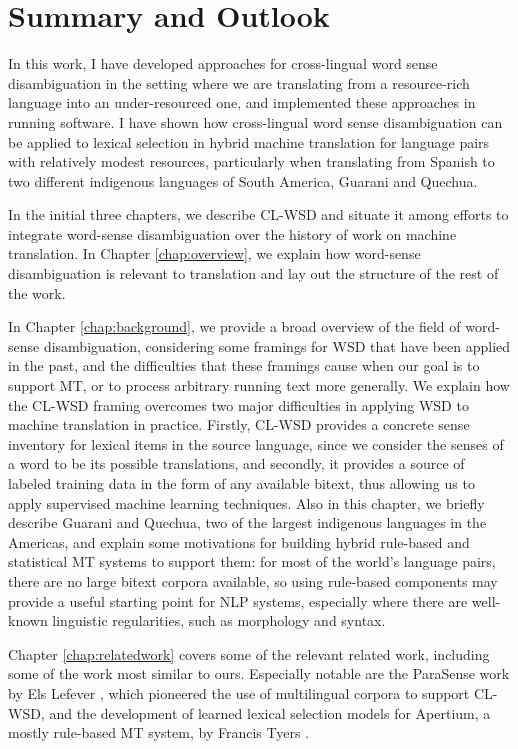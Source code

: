 \chapter{Summary and Outlook}
\label{chap:conclusions}

In this work, I have developed approaches for cross-lingual word sense
disambiguation in the setting where we are translating from a resource-rich
language into an under-resourced one, and implemented these approaches in
running software.
I have shown how cross-lingual word sense disambiguation can be applied to
lexical selection in hybrid machine translation for language pairs with
relatively modest resources, particularly when translating from Spanish to two
different indigenous languages of South America, Guarani and Quechua.

In the initial three chapters, we describe CL-WSD and situate it among efforts
to integrate word-sense disambiguation over the history of work on machine
translation. In Chapter \ref{chap:overview}, we explain how word-sense
disambiguation is relevant to translation and lay out the structure of the rest
of the work.

In Chapter \ref{chap:background}, we provide a broad overview of the field of
word-sense disambiguation, considering some framings for WSD that have been
applied in the past, and the difficulties that these framings cause when our
goal is to support MT, or to process arbitrary running text more generally.
We explain how the CL-WSD framing overcomes two major difficulties in applying
WSD to machine translation in practice. Firstly, CL-WSD provides a concrete
sense inventory for lexical items in the source language, since we consider the
senses of a word to be its possible translations, and secondly, it provides a
source of labeled training data in the form of any available bitext, thus
allowing us to apply supervised machine learning techniques. Also in this
chapter, we briefly describe Guarani and Quechua, two of the largest indigenous
languages in the Americas, and explain some motivations for building hybrid
rule-based and statistical MT systems to support them: for most of the world's
language pairs, there are no large bitext corpora available, so using
rule-based components may provide a useful starting point for NLP systems,
especially where there are well-known linguistic regularities, such as
morphology and syntax.

Chapter \ref{chap:relatedwork} covers some of the relevant related work,
including some of the work most similar to ours.  Especially notable are the
ParaSense work by Els Lefever \cite{lefever-hoste-decock:2011:ACL-HLT2011},
which pioneered the use of multilingual corpora to support CL-WSD, and the
development of learned lexical selection models for Apertium, a mostly
rule-based MT system, by Francis Tyers \cite{tyers-dissertation}.


